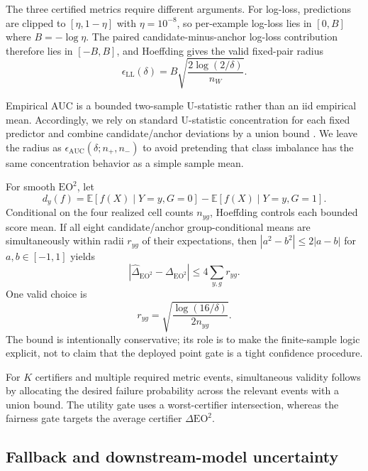 \documentclass[10pt]{article}
\newcommand{\eo}{\mathrm{EO}^2}
\newcommand{\AUC}{\mathrm{AUC}}
\newcommand{\LL}{\mathrm{LL}}
\begin{document}
The three certified metrics require different arguments.
For log-loss, predictions are clipped to $[\eta,1-\eta]$ with $\eta=10^{-8}$, so per-example log-loss lies in $[0,B]$ where $B=-\log\eta$.
The paired candidate-minus-anchor log-loss contribution therefore lies in $[-B,B]$, and Hoeffding gives the valid fixed-pair radius
\begin{equation}
\epsilon_{\LL}(\delta)=B\sqrt{\frac{2\log(2/\delta)}{n_W}}.
\end{equation}

Empirical AUC is a bounded two-sample U-statistic rather than an iid empirical mean.
Accordingly, we rely on standard U-statistic concentration for each fixed predictor and combine candidate/anchor deviations by a union bound \citep{clemencon2008ranking}.
We leave the radius as $\epsilon_{\AUC}(\delta;n_+,n_-)$ to avoid pretending that class imbalance has the same concentration behavior as a simple sample mean.

For smooth $\eo$, let
\begin{equation}
d_y(f)=\mathbb E[f(X)\mid Y=y,G=0]-\mathbb E[f(X)\mid Y=y,G=1].
\end{equation}
Conditional on the four realized cell counts $n_{yg}$, Hoeffding controls each bounded score mean.
If all eight candidate/anchor group-conditional means are simultaneously within radii $r_{yg}$ of their expectations, then $|a^2-b^2|\le2|a-b|$ for $a,b\in[-1,1]$ yields
\begin{equation}
|\widehat\Delta_{\eo}-\Delta_{\eo}|
\le 4\sum_{y,g} r_{yg}.
\label{eq:eobound}
\end{equation}
One valid choice is
\begin{equation}
r_{yg}=\sqrt{\frac{\log(16/\delta)}{2n_{yg}}}.
\end{equation}
The bound is intentionally conservative; its role is to make the finite-sample logic explicit, not to claim that the deployed point gate is a tight confidence procedure.

For $K$ certifiers and multiple required metric events, simultaneous validity follows by allocating the desired failure probability across the relevant events with a union bound.
The utility gate uses a worst-certifier intersection, whereas the fairness gate targets the average certifier $\Delta\eo$.

\subsection{Fallback and downstream-model uncertainty}
\end{document}
